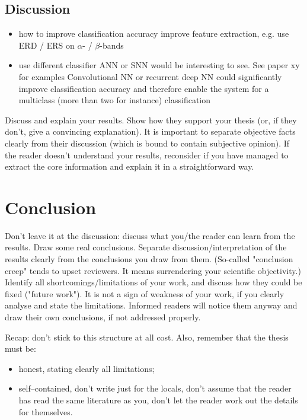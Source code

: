 \documentclass[a4paper,twoside, openright,12pt]{report}
\begin{document}
\section{Discussion}
\begin{itemize}
	\item how to improve classification accuracy
	\subitem improve feature extraction, e.g. use ERD / ERS on $\alpha$- / $\beta$-bands 
	\item use different classifier 
	\subitem ANN or SNN would be interesting to see. See paper xy for examples
	\subitem Convolutional NN or recurrent deep NN could significantly improve classification accuracy and therefore enable the system for a multiclass (more than two for instance) classification 
\end{itemize}


Discuss and explain your results. Show how they support your thesis (or, if they don't, give a convincing explanation). It is important to separate objective facts clearly from their discussion (which is bound to contain subjective opinion). If the reader doesn't understand your results, reconsider if you have managed to extract the core information and explain it in a straightforward way.




\chapter{Conclusion}

Don't leave it at the discussion: discuss what you/the reader can learn from the results. Draw some real conclusions. Separate discussion/interpretation of the results clearly from the conclusions you draw from them. (So-called "conclusion creep" tends to upset reviewers. It means surrendering your scientific objectivity.) Identify all shortcomings/limitations of your work, and discuss how they could be fixed ("future work"). It is not a sign of weakness of your work, if you clearly analyse and state the limitations. Informed readers will notice them anyway and draw their own conclusions, if not addressed properly.

\vspace{\baselineskip}
Recap: don't stick to this structure at all cost. Also, remember that the thesis must be:

\begin{itemize}
	\item honest, stating clearly all limitations;
	\item self--contained, don't write just for the locals, don't assume that the reader has read the same literature as you, don't let the reader work out the details for themselves.
\end{itemize}
\end{document}
